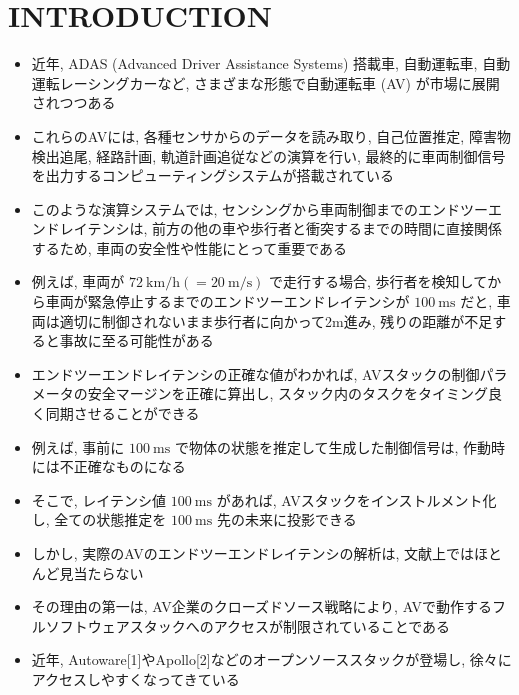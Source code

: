 
\section{INTRODUCTION}
\label{sec: introduction}

\begin{frame}{}
    \begin{itemize}
        \item 近年, ADAS (Advanced Driver Assistance Systems) 搭載車, 自動運転車, 自動運転レーシングカーなど, さまざまな形態で自動運転車 (AV) が市場に展開されつつある
        \item これらのAVには, 各種センサからのデータを読み取り, 自己位置推定, 障害物検出追尾, 経路計画, 軌道計画追従などの演算を行い, 最終的に車両制御信号を出力するコンピューティングシステムが搭載されている
        \item このような演算システムでは, センシングから車両制御までのエンドツーエンドレイテンシは, 前方の他の車や歩行者と衝突するまでの時間に直接関係するため, 車両の安全性や性能にとって重要である
    \end{itemize}
\end{frame}

\begin{frame}{}
    \begin{itemize}
        \item 例えば, 車両が $72 \mathrm{~km} / \mathrm{h}(=20 \mathrm{~m} / \mathrm{s})$ で走行する場合, 歩行者を検知してから車両が緊急停止するまでのエンドツーエンドレイテンシが $100 \mathrm{~ms}$ だと, 車両は適切に制御されないまま歩行者に向かって2m進み, 残りの距離が不足すると事故に至る可能性がある
        \item エンドツーエンドレイテンシの正確な値がわかれば, AVスタックの制御パラメータの安全マージンを正確に算出し, スタック内のタスクをタイミング良く同期させることができる
        \item 例えば, 事前に $100 \mathrm{~ms}$ で物体の状態を推定して生成した制御信号は, 作動時には不正確なものになる
        \item そこで, レイテンシ値 $100 \mathrm{~ms}$ があれば, AVスタックをインストルメント化し, 全ての状態推定を $100 \mathrm{~ms}$ 先の未来に投影できる
    \end{itemize}
\end{frame}

\begin{frame}{}
    \begin{itemize}
        \item しかし, 実際のAVのエンドツーエンドレイテンシの解析は, 文献上ではほとんど見当たらない
        \item その理由の第一は, AV企業のクローズドソース戦略により, AVで動作するフルソフトウェアスタックへのアクセスが制限されていることである
        \item 近年, Autoware[1]やApollo[2]などのオープンソーススタックが登場し, 徐々にアクセスしやすくなってきている
    \end{itemize}
\end{frame}

